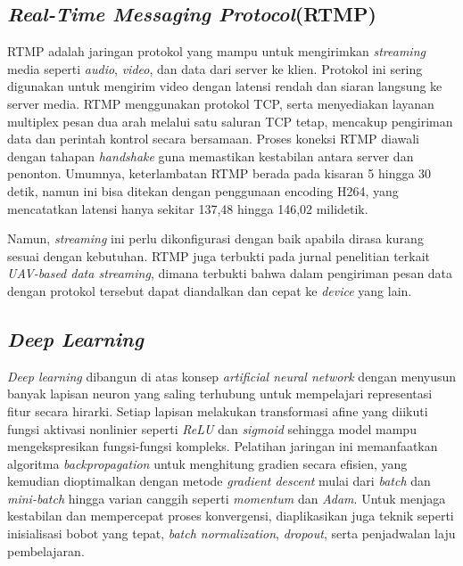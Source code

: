 \subsection{\emph{Real-Time Messaging Protocol}(RTMP)}
RTMP adalah jaringan protokol yang mampu untuk mengirimkan \emph{streaming} media seperti \emph{audio}, \emph{video}, dan data dari server ke klien. Protokol ini sering digunakan untuk mengirim video dengan latensi rendah dan siaran langsung ke server media. RTMP menggunakan protokol TCP, serta menyediakan layanan multiplex pesan dua arah melalui satu saluran TCP tetap, mencakup pengiriman data dan perintah kontrol secara bersamaan. Proses koneksi RTMP diawali dengan tahapan \emph{handshake} guna memastikan kestabilan antara server dan penonton. Umumnya, keterlambatan RTMP berada pada kisaran 5 hingga 30 detik, namun ini bisa ditekan dengan penggunaan encoding H264, yang mencatatkan latensi hanya sekitar 137,48 hingga 146,02 milidetik\cite{rtmp}.

Namun, \emph{streaming} ini perlu dikonfigurasi dengan baik apabila dirasa kurang sesuai dengan kebutuhan. RTMP juga terbukti pada jurnal penelitian terkait \emph{UAV-based data streaming}, dimana terbukti bahwa dalam pengiriman pesan data dengan protokol tersebut dapat diandalkan dan cepat ke \emph{device} yang lain\cite{rtmp}.

\subsection{\emph{Deep Learning}}
\emph{Deep learning} dibangun di atas konsep \emph{artificial neural network} dengan menyusun banyak lapisan neuron yang saling terhubung untuk mempelajari representasi fitur secara hirarki. Setiap lapisan melakukan transformasi afine yang diikuti fungsi aktivasi nonlinier seperti \emph{ReLU} dan \emph{sigmoid} sehingga model mampu mengekspresikan fungsi-fungsi kompleks. Pelatihan jaringan ini memanfaatkan algoritma \emph{backpropagation} untuk menghitung gradien secara efisien, yang kemudian dioptimalkan dengan metode \emph{gradient descent} mulai dari \emph{batch} dan \emph{mini-batch} hingga varian canggih seperti \emph{momentum} dan \emph{Adam}. Untuk menjaga kestabilan dan mempercepat proses konvergensi, diaplikasikan juga teknik seperti inisialisasi bobot yang tepat, \emph{batch normalization}, \emph{dropout}, serta penjadwalan laju pembelajaran.

